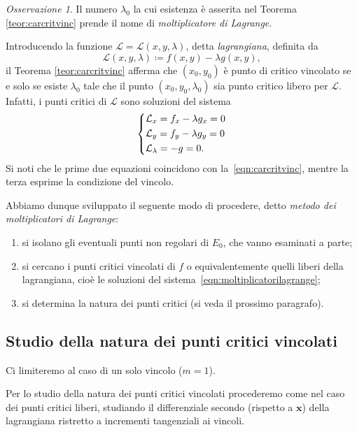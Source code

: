 \documentclass[a4paper]{book}
\numberwithin{equation}{section}
\theoremstyle{plain}
\theoremstyle{definition}
\theoremstyle{remark}
\newtheorem{oss}{Osservazione}[section]
\renewcommand{\vec}{\boldsymbol}
\theoremstyle{example}
\begin{document}
\begin{oss}
Il numero $\lambda_0$ la cui esistenza è asserita nel Teorema \ref{teor:carcritvinc} prende il nome di \emph{moltiplicatore di Lagrange}.

Introducendo la funzione $\mathcal{L} = \mathcal{L}(x, y, \lambda)$, detta \emph{lagrangiana}, definita da
	\begin{equation*}
	\mathcal{L}(x, y, \lambda) \coloneqq f(x,y) - \lambda g(x,y),
	\end{equation*}
il Teorema \ref{teor:carcritvinc} afferma che $(x_0, y_0)$ è punto di critico vincolato se e solo se esiste $\lambda_0$ tale che il punto $(x_0, y_0, \lambda_0)$ sia punto critico libero per $\mathcal{L}$. Infatti, i punti critici di $\mathcal{L}$ sono soluzioni del sistema
	\begin{equation}
	\label{eqn:moltiplicatorilagrange}
	\begin{dcases}
	\mathcal{L}_x = f_x - \lambda g_x = 0 \\
	\mathcal{L}_y = f_y - \lambda g_y = 0 \\
	\mathcal{L}_{\lambda} = -g = 0.
	\end{dcases}
	\end{equation}
Si noti che le prime due equazioni coincidono con la~\eqref{eqn:carcritvinc}, mentre la terza esprime la condizione del vincolo.
\end{oss}

Abbiamo dunque sviluppato il seguente modo di procedere, detto \emph{metodo dei moltiplicatori di Lagrange}:
\begin{enumerate}
	\item si isolano gli eventuali punti non regolari di $E_0$, che vanno esaminati a parte;
	\item si cercano i punti critici vincolati di $f$ o equivalentemente quelli liberi della lagrangiana, cioè le soluzioni del sistema~\eqref{eqn:moltiplicatorilagrange};
	\item si determina la natura dei punti critici (si veda il prossimo paragrafo).
\end{enumerate}

\subsection{Studio della natura dei punti critici vincolati}
Ci limiteremo al caso di un solo vincolo ($m = 1$).

Per lo studio della natura dei punti critici vincolati procederemo come nel caso dei punti critici liberi, studiando il differenziale secondo (rispetto a $\vec{x}$) della lagrangiana ristretto a incrementi tangenziali ai vincoli.
\end{document}
